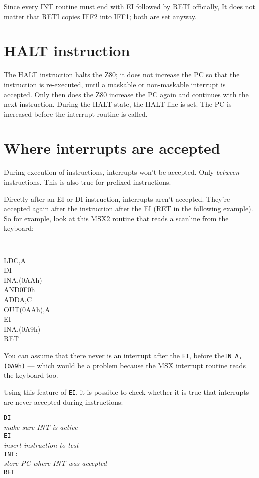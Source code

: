\documentclass[oneside,a4paper]{book}
\begin{document}
Since every INT routine must end with {\ttfamily EI} followed by {\ttfamily RETI} officially, It does not matter that RETI copies IFF2 into IFF1; both are set anyway.


\section{HALT instruction}

The HALT instruction halts the Z80; it does not increase the PC so that the instruction is re-executed, until a maskable or non-maskable interrupt is accepted. Only then does the Z80 increase the PC again and continues with the next instruction. During the HALT state, the HALT line is set. The PC is increased before the interrupt routine is called.


\section{Where interrupts are accepted}

During execution of instructions, interrupts won't be accepted. Only {\em between} instructions. This is also true for prefixed instructions.

Directly after an EI or DI instruction, interrupts aren't accepted. They're accepted again after the instruction after the EI (RET in the following example). So for example, look at this MSX2 routine that reads a scanline from the keyboard:

{\tt
	\begin{tabbing}
		{\qquad}\=LD{\qquad}\=C,A\+\\
		DI\\
		IN\>A,(0AAh)\\
		AND\>0F0h\\
		ADD\>A,C\\
		OUT\>(0AAh),A\\
		EI\\
		IN\>A,(0A9h)\\
		RET
	\end{tabbing}
}


You can assume that there never is an interrupt after the {\tt EI}, before the{\tt IN A,(0A9h)} --- which would be a problem because the MSX interrupt routine reads the keyboard too.

Using this feature of {\tt EI}, it is possible to check whether it is true that interrupts are never accepted during instructions:

\begin{tabbing}
	{\qquad}\={\tt DI}\+\\
	{\em make sure INT is active}\\
	{\tt EI}\\
	{\em insert instruction to test}\-\\
	{\tt INT:}\+\\
	{\em store PC where INT was accepted}\\
	{\tt RET}
\end{tabbing}
\end{document}
